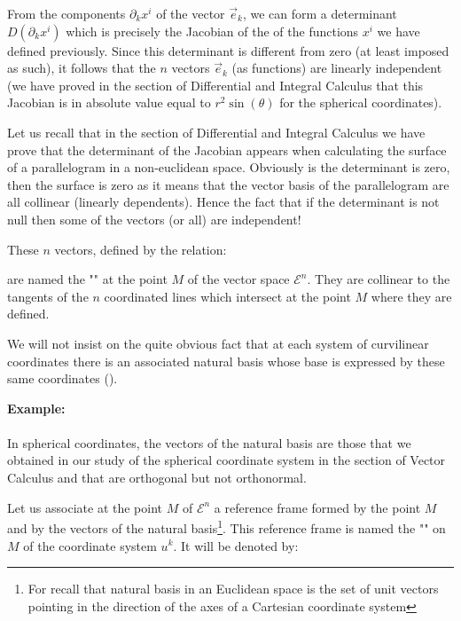 	From the components $\partial_k x^i$ of the vector $\vec{e}_k$, we can form a determinant $D(\partial_kx^i)$ which is precisely the Jacobian of the of the functions $x^i$ we have defined previously. Since this determinant is different from zero (at least imposed as such), it follows that the $n$ vectors $\vec{e}_k$ (as functions) are linearly independent (we have proved in the section of Differential and Integral Calculus that this Jacobian is in absolute value equal to $r^2\sin(\theta)$ for the spherical coordinates).
	\begin{tcolorbox}[title=Remark,colframe=black,arc=10pt]
	Let us recall that in the section of Differential and Integral Calculus we have prove that the determinant of the Jacobian appears when calculating the surface of a parallelogram in a non-euclidean space. Obviously is the determinant is zero, then the surface is zero as it means that the vector basis of the parallelogram are all collinear (linearly dependents). Hence the fact that if the determinant is not null then some of the vectors (or all) are independent!
	\end{tcolorbox}
	These $n$ vectors, defined by the relation:
	
	are named the "" at the point $M$ of the vector space $\mathcal{E}^n$. They are collinear to the tangents of the $n$ coordinated lines which intersect at the point $M$ where they are defined.
	
	We will not insist on the quite obvious fact that at each system of curvilinear coordinates there is an associated natural basis whose base is expressed by these same coordinates ().
	\begin{tcolorbox}[colframe=black,colback=white,sharp corners]
	\textbf{{\Large {}}Example:}\\\\
	In spherical coordinates, the vectors of the natural basis are those that we obtained in our study of the spherical coordinate system in the section of Vector Calculus and that are orthogonal but not orthonormal.
	\end{tcolorbox}
	
	Let us associate at the point $M$ of $\mathcal{E}^n$ a reference frame formed by the point $M$ and by the vectors of the natural basis\footnote{For recall that natural basis in an Euclidean space is the set of unit vectors pointing in the direction of the axes of a Cartesian coordinate system}. This reference frame is named the "" on $M$ of the coordinate system $u^k$. It will be denoted by:
	
